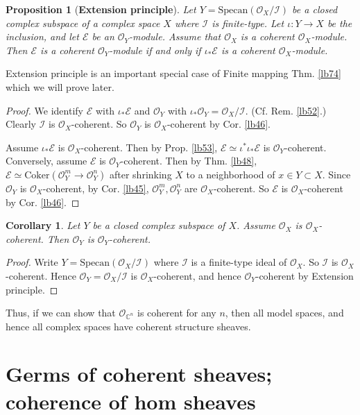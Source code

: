 \documentclass[12pt,b5paper,notitlepage]{report}
\theoremstyle{definition}
\theoremstyle{plain}
\newtheorem{pp}[df]{Proposition}
\newtheorem{co}[df]{Corollary}
\newcommand{\mc}{\mathcal}
\newcommand{\scr}{\mathscr}
\newcommand{\Cbb}{\mathbb C}
\newcommand{\Cok}{\mathrm{Coker}}
\newcommand{\Specan}{\mathrm{Specan}}
\numberwithin{equation}{section}
\begin{document}
\begin{pp}[\textbf{Extension principle}]\label{lb73}
Let $Y=\Specan(\scr O_X/\mc I)$ be a closed complex subspace of a complex space $X$ where $\mc I$ is finite-type. Let $\iota:Y\rightarrow X$ be the inclusion, and let $\scr E$ be an $\scr O_Y$-module. Assume that $\scr O_X$ is a coherent $\scr O_X$-module. Then $\scr E$ is a coherent $\scr O_Y$-module if and only if $\iota_*\scr E$ is a coherent $\scr O_X$-module.
\end{pp}

Extension principle is an important special case of Finite mapping Thm. \ref{lb74} which we will prove later.


\begin{proof}
We identify $\scr E$ with $\iota_*\scr E$ and $\scr O_Y$ with $\iota_*\scr O_Y=\scr O_X/\mc I$. (Cf. Rem. \ref{lb52}.) Clearly $\mc I$ is $\scr O_X$-coherent. So $\scr O_Y$ is $\scr O_X$-coherent by Cor. \ref{lb46}.

Assume $\iota_*\scr E$ is $\scr O_X$-coherent. Then by Prop. \ref{lb53}, $\scr E\simeq\iota^*\iota_*\scr E$ is $\scr O_Y$-coherent. Conversely, assume $\scr E$ is $\scr O_Y$-coherent. Then by Thm. \ref{lb48}, $\scr E\simeq\Cok(\scr O_Y^m\rightarrow\scr O_Y^n)$ after shrinking $X$ to a neighborhood of $x\in Y\subset X$. Since $\scr O_Y$ is $\scr O_X$-coherent, by Cor. \ref{lb45}, $\scr O_Y^m,\scr O_Y^n$ are $\scr O_X$-coherent. So $\scr E$ is $\scr O_X$-coherent by Cor. \ref{lb46}.
\end{proof}


\begin{co}\label{lb67}
Let $Y$ be a closed complex subspace of $X$. Assume $\scr O_X$ is $\scr O_X$-coherent. Then $\scr O_Y$ is $\scr O_Y$-coherent.
\end{co}

\begin{proof}
Write $Y=\Specan(\scr O_X/\mc I)$ where $\mc I$ is a finite-type ideal of $\scr O_X$. So $\mc I$ is $\scr O_X$-coherent. Hence $\scr O_Y=\scr O_X/\mc I$ is $\scr O_X$-coherent, and hence $\scr O_Y$-coherent by Extension principle.
\end{proof}



Thus, if we can show that $\scr O_{\Cbb^n}$ is coherent for any $n$, then all model spaces, and hence all complex spaces have coherent structure sheaves.





\section{Germs of coherent sheaves; coherence of hom sheaves}
\end{document}

